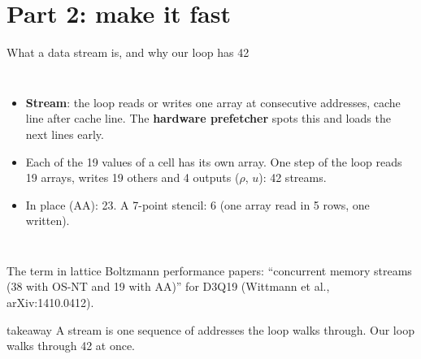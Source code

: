 \documentclass[aspectratio=169,10pt,t]{beamer}
\newcommand{\term}[1]{\textcolor{psblue!85!black}{\textbf{#1}}} %
\newcommand{\takeaway}[1]{\par\vfill
  \begin{beamercolorbox}[wd=\textwidth,sep=4pt,rounded=true]{takeaway}
    \small #1
  \end{beamercolorbox}}
\begin{document}
\section{Part 2: make it fast}

\begin{frame}{What a data stream is, and why our loop has 42}
  \begin{columns}[T,onlytextwidth]
    \vspace{1mm}
    \centering
    \vspace{1mm}
    \begin{itemize}\small
      \item \term{Stream}: the loop reads or writes one array at consecutive addresses, cache line
            after cache line. The \term{hardware prefetcher} spots this and loads the next lines early.
      \item Each of the 19 values of a cell has its own array. One step of the loop reads 19 arrays,
            writes 19 others and 4 outputs ($\rho$, $u$): 42 streams.
      \item In place (AA): 23. A 7-point stencil: 6 (one array read in 5 rows, one written).
    \end{itemize}
  \end{columns}
  \vfill
  {\scriptsize\color{psgray}The term in lattice Boltzmann performance papers: ``concurrent memory streams
  (38 with OS-NT and 19 with AA)'' for D3Q19 (Wittmann et al., arXiv:1410.0412).\par}
  \takeaway{A stream is one sequence of addresses the loop walks through. Our loop walks through 42 at once.}
\end{frame}
\end{document}
